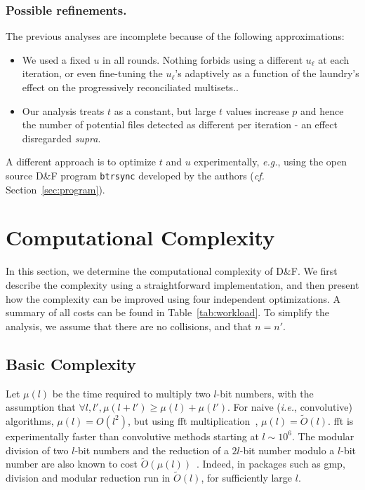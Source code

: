 \documentclass[11pt]{llncs}
\newcommand{\Oapp}{\ensuremath{\tilde{O}}}
\newcommand{\df}{D\&F\xspace}
\newcommand{\btrsync}{\texttt{btrsync}\xspace}
\newcommand{\ie}{\textit{i.e.}\xspace}
\newcommand{\cf}{\textit{cf.}\xspace}
\newcommand{\eg}{\textit{e.g.}\xspace}
\newcommand{\comm}[1]{\marginpar{%
\vskip-\baselineskip %
\raggedright\footnotesize
\itshape\hrule\smallskip#1\par\smallskip\hrule}}
\begin{document}
\subsubsection{Possible refinements.} The previous analyses are incomplete because of the following approximations:
\begin{itemize}

\item We used a fixed $u$ in all rounds. Nothing forbids using a different $u_\ell$ at each iteration, or even fine-tuning the $u_\ell$'s adaptively as a function of the laundry's effect on the progressively reconciliated multisets..

\item \comm{À voir avec David.} Our analysis treats $t$ as a constant, but large $t$ values increase $p$ and hence the number of potential files detected as different per iteration - an effect disregarded \textit{supra}.
\end{itemize}

A different approach is to optimize $t$ and $u$ experimentally, \eg, using the open source \df program \btrsync developed by the authors (\cf Section~\ref{sec:program}).

\section{Computational Complexity}
\label{sec:comp}
In this section, we determine the computational complexity of \df. We first describe the complexity using a straightforward implementation, and then present how the complexity can be improved using four independent optimizations. A summary of all costs can be found in Table~\ref{tab:workload}.
To simplify the analysis, we assume that there are no collisions, and that $n=n'$.


\subsection{Basic Complexity}
\label{sec:basiccomp}

Let $\mu(l)$ be the time required to multiply two $l$-bit numbers, with the assumption that $\forall l,l', \mu(l+l') \ge \mu(l) + \mu(l')$.
For naive (\ie, convolutive) algorithms, $\mu(l) = O(l^2)$, but using {\sc fft} multiplication~\cite{schonhage1971schnelle}, $\mu(l) = \Oapp(l)$. {\sc fft} is experimentally faster than convolutive methods starting at $l \sim 10^6$.
The modular division of two $l$-bit numbers and the reduction of a $2l$-bit number modulo a $l$-bit number are also known to cost $\Oapp(\mu(l))$~\cite{burnikel1998fast}.
Indeed, in packages such as {\sf gmp}, division and modular reduction run in $\Oapp(l)$, for sufficiently large $l$.
\end{document}
